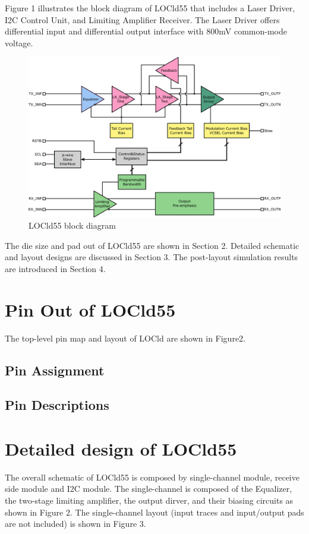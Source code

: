 \documentclass[11pt,a4paper]{article}
\begin{document}
\begin{spacing}{1.25}
Figure 1 illustrates the block diagram of LOCld55 that includes a Laser Driver, I2C Control Unit, and Limiting Amplifier Receiver. The Laser Driver offers differential input and differential output interface with 800mV common-mode voltage.

\begin{figure}[H]
    \centerline{\includegraphics[width=\linewidth]{./Img/locld55.png}}
    \caption{LOCld55 block diagram}
\end{figure}

The die size and pad out of LOCld55 are shown in Section 2. Detailed schematic and layout designs are discussed in Section 3. The post-layout simulation results are introduced in Section 4.

\section{Pin Out of LOCld55}                %
The top-level pin map and layout of LOCld are shown in Figure2.

\subsection{Pin Assignment}

\subsection{Pin Descriptions}

\section{Detailed design of LOCld55}        %
The overall schematic of LOCld55 is composed by single-channel module, receive side module and I2C module. The single-channel is composed of the Equalizer, the two-stage limiting amplifier, the output dirver, and their biasing circuits as shown in Figure 2. The single-channel layout (input traces and input/output pads are not included) is shown in Figure 3.


\end{spacing}
\end{document}
